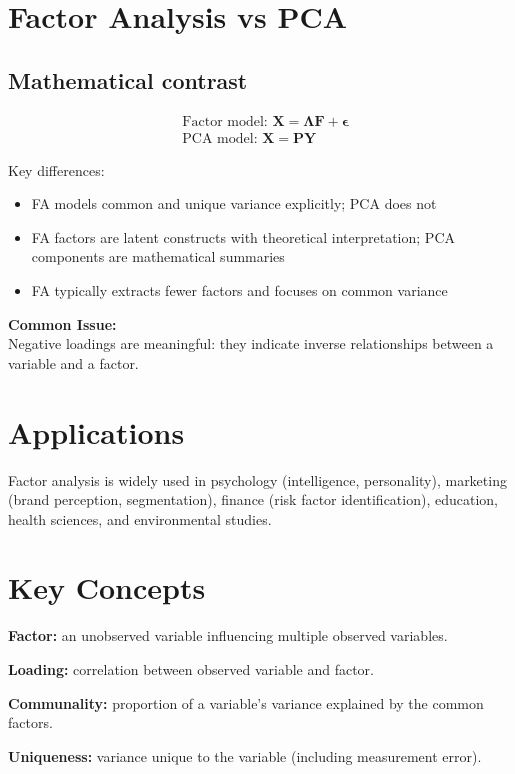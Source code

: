 \documentclass[a4paper,11pt]{tufte-book}
\newcommand{\issueTitle}[1]{\textcolor{tecorange}{\textbf{#1}}}
\newenvironment{commonissue}{%
    \begin{framed}
    \noindent\issueTitle{Common Issue:}\\
}{%
    \end{framed}}
\begin{document}
\section{Factor Analysis vs PCA}

\subsection{Mathematical contrast}
\begin{align*}
  &\text{Factor model: } \mathbf{X} = \mathbf{\Lambda F} + \mathbf{\epsilon}\\
  &\text{PCA model: } \mathbf{X} = \mathbf{PY}
\end{align*}

Key differences:
\begin{itemize}
  \item FA models common and unique variance explicitly; PCA does not
  \item FA factors are latent constructs with theoretical interpretation; PCA components are mathematical summaries
  \item FA typically extracts fewer factors and focuses on common variance
\end{itemize}

\begin{commonissue}
Negative loadings are meaningful: they indicate inverse relationships between a variable and a factor.
\end{commonissue}

\section{Applications}
Factor analysis is widely used in psychology (intelligence, personality), marketing (brand perception, segmentation), finance (risk factor identification), education, health sciences, and environmental studies.

\section{Key Concepts}

\textbf{Factor:} an unobserved variable influencing multiple observed variables.

\textbf{Loading:} correlation between observed variable and factor.

\textbf{Communality:} proportion of a variable's variance explained by the common factors.

\textbf{Uniqueness:} variance unique to the variable (including measurement error).
\end{document}
